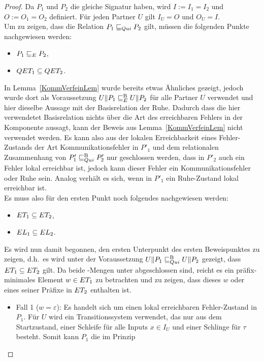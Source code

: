 \begin{proof}
  Da $P_1$ und $P_2$ die gleiche Signatur haben, wird $I:=I_1=I_2$ und
  $O:=O_1=O_2$ definiert. Für jeden Partner $U$ gilt $I_U=O$ und $O_U=I$.\\
  Um zu zeigen, dass die Relation $P_1 \sqsubseteq  _{Qui} P_2$ gilt, müssen die folgenden
  Punkte nachgewiesen werden:
  \begin{itemize}
    \item $P_1 \sqsubseteq  _E P_2$,
    \item $QET _1\subseteq QET _2$.
  \end{itemize}
  In Lemma~\ref{KommVerfeinLem} wurde bereits etwas Ähnliches gezeigt, jedoch
  wurde dort als Voraussetzung $U\|P_1 \sqsubseteq  _E^\mathrm{B} U\|P_2$ für alle Partner $U$
  verwendet und hier dieselbe Aussage mit der Basisrelation der Ruhe. Dadurch
  dass die hier verwendetet Basisrelation nichts über die Art des erreichbaren
  Fehlers in der Komponente aussagt, kann der Beweis aus
  Lemma~\ref{KommVerfeinLem} nicht verwendet werden. Es kann also aus der
  lokalen Erreichbarkeit eines Fehler-Zustands der Art Kommunikationsfehler in
  $P'_1$ und dem relationalen Zusammenhang von $P'_1 \sqsubseteq  _{Qui}^\mathrm{B} P'_2$ nur
  geschlossen werden, dass in $P'_2$ auch ein Fehler lokal erreichbar ist,
  jedoch kann dieser Fehler ein Kommunikationsfehler oder Ruhe sein. Analog
  verhält es sich, wenn in $P'_1$ ein Ruhe-Zustand lokal erreichbar ist.\\
  Es muss also für den ersten Punkt noch folgendes nachgewiesen werden:
  \begin{itemize}
    \item $ET _1\subseteq ET _2$,
    \item $EL _1\subseteq EL _2$.
  \end{itemize}
  Es wird nun damit begonnen, den ersten Unterpunkt des ersten Beweispunktes zu
  zeigen, d.h.\ es wird unter der Voraussetzung $U\|P_1 \sqsubseteq  _{Qui}^\mathrm{B} U\|P_2$ gezeigt,
  dass $ET _1\subseteq ET _2$ gilt. Da beide \ET{}-Mengen unter \cont{}
  abgeschlossen sind, reicht es ein präfix-minimales Element $w\in ET _1$ zu
  betrachten und zu zeigen, dass dieses $w$ oder eines seiner Präfixe in $ET
  _2$ enthalten ist.
  \begin{itemize}
    \item Fall 1 ($w=\varepsilon$): Es handelt sich um einen lokal erreichbaren
      Fehler-Zustand in $P_1$. Für $U$ wird ein Transitionssystem verwendet,
      das nur aus dem Startzustand, einer Schleife für alle Inputs $x\in I_U$
      und einer Schlinge für $\tau$ besteht. Somit kann $P_1$ die im Prinzip

\end{itemize}
\end{proof}
